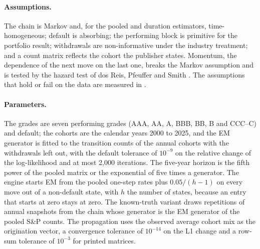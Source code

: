 \paragraph{Assumptions.} The chain is Markov and, for the pooled and duration estimators, time-homogeneous; default is absorbing; the performing block is primitive for the portfolio result; withdrawals are non-informative under the industry treatment; and a count matrix reflects the cohort the publisher states. Momentum, the dependence of the next move on the last one, breaks the Markov assumption and is tested by the hazard test of dos Reis, Pfeuffer and Smith \citep{ratings:dosreis2020}. The assumptions that hold or fail on the data are measured in .

\paragraph{Parameters.} The grades are seven performing grades (AAA, AA, A, BBB, BB, B and CCC--C) and default; the cohorts are the calendar years 2000 to 2025, and the EM generator is fitted to the transition counts of the annual cohorts with the withdrawals left out, with the default tolerance of $10^{-9}$ on the relative change of the log-likelihood and at most 2,000 iterations. The five-year horizon is the fifth power of the pooled matrix or the exponential of five times a generator. The engine starts EM from the pooled one-step rates plus $0.05/(h-1)$ on every move out of a non-default state, with $h$ the number of states, because an entry that starts at zero stays at zero. The known-truth variant draws \rtgMkReps{} repetitions of \rtgMkSnap{} annual snapshots from the chain whose generator is the EM generator of the pooled S\&P counts. The propagation uses the observed average cohort mix as the origination vector, a convergence tolerance of $10^{-14}$ on the L1 change and a row-sum tolerance of $10^{-3}$ for printed matrices.

